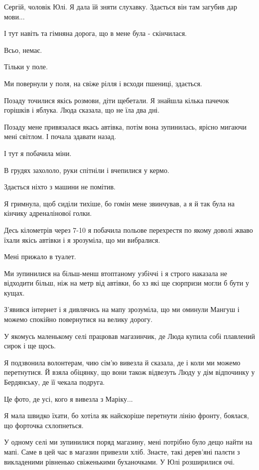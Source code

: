 Сергій, чоловік Юлі. Я дала їй зняти слухавку. Здається він там загубив дар
мови...

І тут навіть та гімняна дорога, що в мене була - скінчилася.

Всьо, немає.

Тільки у поле. 

Ми повернули у поля, на свіже рілля і всходи пшениці, здається.

Позаду точилися якісь розмови, діти щебетали. Я знайшла кілька пачечок горішків
і яблука. Люда сказала, що не їла два дні.

Позаду мене привязалася якась автівка, потім вона зупинилась, ярісно мигаючи
мені світлом. І почала здавати назад.

І тут я побачила міни.

В грудях захололо, руки спітніли і вчепилися у кермо. 

Здається ніхто з машини не помітив.

Я гримнула, щоб сиділи тихіше, бо гомін мене звинчував, а я й так була на
кінчику адреналінової голки.

Десь кілометрів через 7-10 я побачила польове перехрестя по якому доволі жваво
їхали якісь автівки і я зрозуміла, що ми вибралися.

Мені прижало  в туалет.

Ми зупинилися на більш-менш втоптаному узбіччі і я строго наказала не відходити
більш, ніж на метр від автівки,  бо хз які ще сюрпризи могли б  бути у кущах.

З'явився інтернет і я дивлячись на мапу зрозуміла, що ми оминули Мангуш і
можемо спокійно повернутися на велику дорогу.

У якомусь маленькому селі працював магазинчик, де Люда купила собі плавлений
сирок і ще щось.

Я подзвонила волонтерам, чию сім'ю вивезла й сказала, де і коли ми можемо
перетнутися. Й взяла обіцянку, що вони також відвезуть Люду у дім відпочинку у
Бердянську,  де її чекала подруга.

Це фото, де усі, кого я вивезла з Маріку...

Я мала швидко їхати, бо хотіла як найскоріше перетнути лінію фронту, боялася,
що форточка схлопнеться.

У одному селі ми зупинилися поряд магазину, мені потрібно було дещо найти на
мапі. Саме в цей час в магазин привезли хліб. Знаєте, такі дерев'яні палєти з
викладеними рівненько свіженькими буханочками. У Юлі розширилися очі.

